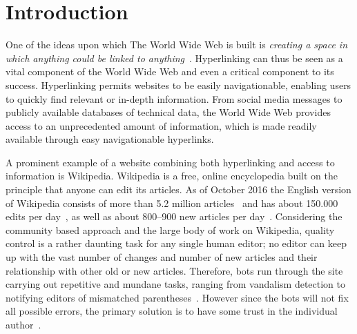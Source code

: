 \chapter{Introduction}
\label{ch:introduction}
One of the ideas upon which The World Wide Web is built is \emph{creating a space in which anything could be linked to anything}~\cite[ch.~1, p.~4]{Weaving-the-web}. Hyperlinking can thus be seen as a vital component of the World Wide Web and even a critical component to its success. Hyperlinking permits websites to be easily navigationable, enabling users to quickly find relevant or in-depth information. From social media messages to publicly available databases of technical data, the World Wide Web provides access to an unprecedented amount of information, which is made readily available through easy navigationable hyperlinks.

A prominent example of a website combining both hyperlinking and access to information is Wikipedia. Wikipedia is a free, online encyclopedia built on the principle that anyone can edit its articles. As of October 2016 the English version of Wikipedia consists of more than 5.2 million articles~\cite{wiki-about} and has about 150.000 edits per day~\cite{wiki-num-edits}, as well as about 800--900 new articles per day~\cite{wmcharts}. Considering the community based approach and the large body of work on Wikipedia, quality control is a rather daunting task for any single human editor; no editor can keep up with the vast number of changes and number of new articles and their relationship with other old or new articles. Therefore, bots run through the site carrying out repetitive and mundane tasks, ranging from vandalism detection to notifying editors of mismatched parentheses~\cite{wiki-bots}. However since the bots will not fix all possible errors, the primary solution is to have some trust in the individual author~\cite{wiki-editor-guidelines}.


